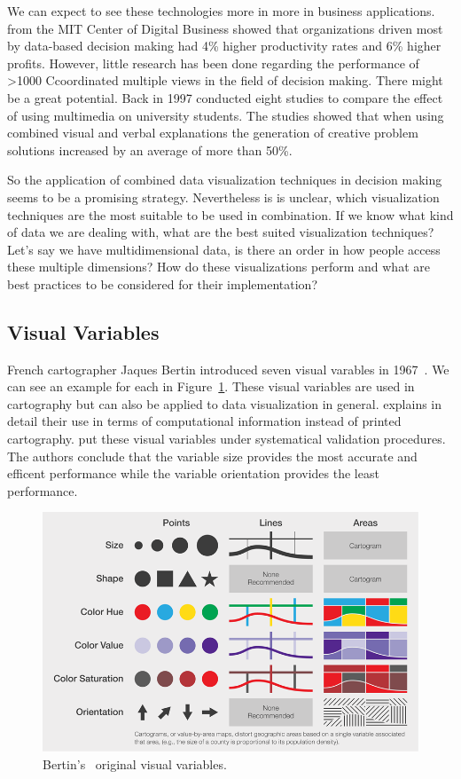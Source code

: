 \documentclass{article}
\newcommand\hmm[1]{\ifnum\ifhmode\spacefactor\else2000\fi>1000 \uppercase{#1}\else#1\fi}
\newcommand{\cmvs}{\hmm{c}oordinated multiple views}
\begin{document}
We can expect to see these technologies more in more in business applications.
\textcite{McAfee2012} from the MIT Center of Digital Business showed that organizations driven most by data-based decision making had 4\% higher productivity rates and 6\% higher profits.
However, little research has been done regarding the performance of \cmvs{} in the field of decision making.
There might be a great potential.
Back in 1997 \textcite{Mayer1997} conducted eight studies to compare the effect of using multimedia on university students.
The studies showed that when using combined visual and verbal explanations the generation of creative problem solutions increased by an average of more than 50\%.

So the application of combined data visualization techniques in decision making seems to be a promising strategy.
Nevertheless is is unclear, which visualization techniques are the most suitable to be used in combination.
If we know what kind of data we are dealing with, what are the best suited visualization techniques?
Let's say we have multidimensional data, is there an order in how people access these multiple dimensions?
How do these visualizations perform and what are best practices to be considered for their implementation?


\subsection{Visual Variables}\label{sec:theory:visual-variables}
French cartographer Jaques Bertin introduced seven visual varables in 1967~\cite{Bertin2010}.
We can see an example for each in Figure~\ref{fig:theory:visual-variables}.
These visual variables are used in cartography but can also be applied to data visualization in general.
\textcite{Carpendale2003} explains in detail their use in terms of computational information instead of printed cartography.
\textcite{Garlandini2009} put these visual variables under systematical validation procedures.
The authors conclude that the variable size provides the most accurate and efficent performance while the variable orientation provides the least performance.
\begin{figure}[h!]
  \centering
  \includegraphics[width=\textwidth]{images/visual-variables.png}
  \caption{Bertin's~\cite{Bertin2010} original visual variables.}\label{fig:theory:visual-variables}
\end{figure}
\end{document}
